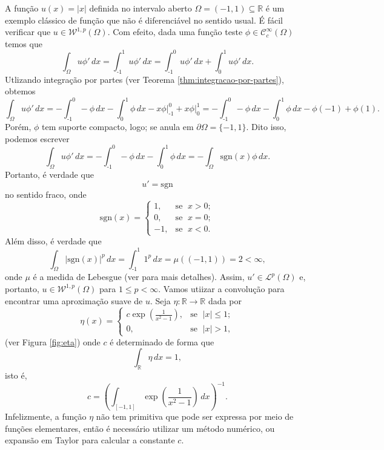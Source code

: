 \documentclass[a4paper, 11pt]{book}
\theoremstyle{definition}
\newcommand{\m}{\text{-}}
\newcommand{\bR}{\mathbb{R}}
\newcommand{\cC}{\mathcal{C}}
\newcommand{\cL}{\mathcal{L}}
\newcommand{\cW}{\mathcal{W}}
\newcommand{\sgn}{\mathrm{sgn}}
\begin{document}
\begin{ex}
    A função $u(x) = |x|$ definida no intervalo aberto $\Omega = (-1,1) \subseteq \bR$ é um exemplo clássico de função que não é diferenciável no sentido usual. É fácil verificar que $u \in \cW^{1,p}(\Omega)$. Com efeito, dada uma função teste $\phi \in \cC^\infty_c(\Omega)$ temos que
    \[
        \int_\Omega u \phi' \,dx = \int_{\text{-}1}^1 u \phi' \,dx = \int_{\text{-}1}^0 u \phi' \,dx + \int_0^1 u \phi' \,dx.
    \]
    Utlizando integração por partes (ver Teorema \ref{thm:integracao-por-partes}), obtemos
    \[
        \int_\Omega u \phi'\,dx =  - \int_{\m1}^0 -\phi \,dx  - \int_0^1 \phi \,dx -x \phi \bigg|^{0}_{\m1}+ x\phi \bigg|_0^1 = -\int_{\m1}^{0} - \phi \,dx -\int_0^1 \phi \,dx - \phi(-1) + \phi(1).
    \]
    Porém, $\phi$ tem suporte compacto, logo; se anula em $\partial\Omega = \{-1,1\}$. Dito isso, podemos escrever
    \[
        \int_\Omega u \phi'\,dx = - \int_{\text{-}1}^0 -\phi \,dx - \int_0^1 \phi \,dx = -\int_\Omega \sgn(x)\phi \,dx.
    \]
    Portanto, é verdade que
    \[
        u'= \sgn
    \]
    no sentido fraco, onde
    \[
        \sgn(x) = 
        \left\{ 
            \begin{array}{rr}
                1, &\!\text{se }\; x > 0;\\
                0, &\!\text{se }\; x = 0;\\
                -1,&\!\text{se }\; x < 0.
            \end{array}
        \right.
    \]
    Além disso, é verdade que
    \[
        \int_\Omega |\sgn(x)|^p \,dx = \int_{\text{-}1}^1 1^p \,dx =  \mu((-1,1)) = 2 < \infty,
    \]
    onde $\mu$ é a medida de Lebesgue (ver \cite{axler-measure.theory} para mais detalhes). Assim, $u'\in \cL^p(\Omega)$ e, portanto, $u \in \cW^{1,p}(\Omega)$ para $1 \leqslant p < \infty$.
    Vamos utiizar a convolução para encontrar uma aproximação suave de $u$. 
    Seja $\eta : \bR \to \bR$ dada por
    \[
        \eta(x) = \left\{ 
            \begin{array}{lr}
                c \exp\left(\frac{1}{x^2 - 1} \right), & \text{se }\; |x| \leqslant 1;\\
                0, & \text{se }\; |x| > 1,
            \end{array}
        \right.
    \]
    (ver Figura \ref{fig:eta})
    onde $c$ é determinado de forma que
    \[
        \int_{\bR} \eta \,dx = 1,
    \]
    isto é,
    \[
        c = \left( \int_{[-1,1]} \exp \left(\frac{1}{x^2 - 1} \right) \, dx\right)^{-1}.
    \]
    Infelizmente, a função $\eta$ não tem primitiva que pode ser expressa por meio de funções elementares, então é necessário utilizar um método numérico, ou expansão em Taylor para calcular a constante $c$.

\end{ex}
\end{document}
